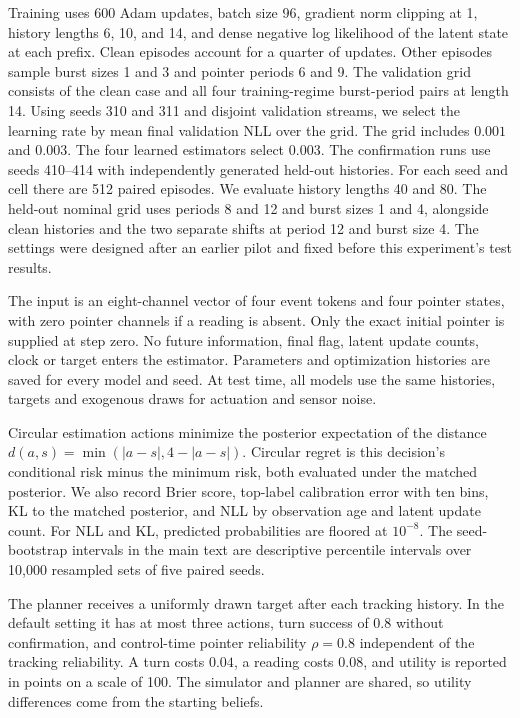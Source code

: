 Training uses 600 Adam updates, batch size 96, gradient norm clipping at 1,
history lengths 6, 10, and 14, and dense negative log likelihood of the
latent state at each prefix. Clean episodes account for a quarter of updates.
Other episodes sample burst sizes 1 and 3 and pointer periods 6 and 9.
The validation grid consists of the clean case and all four training-regime
burst-period pairs at length 14. Using seeds 310 and 311 and disjoint
validation streams, we select the learning rate by mean final validation NLL
over the grid. The grid includes $0.001$ and $0.003$. The four learned estimators
select $0.003$. The confirmation runs use seeds 410--414 with independently
generated held-out histories. For each seed and cell there are 512 paired
episodes. We evaluate history lengths 40 and 80. The held-out nominal grid
uses periods 8 and 12 and burst sizes 1 and 4, alongside clean histories and
the two separate shifts at period 12 and burst size 4. The settings were
designed after an earlier pilot and fixed before this experiment's test results.

The input is an eight-channel vector of four event tokens and four pointer
states, with zero pointer channels if a reading is absent. Only the exact
initial pointer is supplied at step zero. No future information, final flag,
latent update counts, clock or target enters the estimator. Parameters and
optimization histories are saved for every model and seed. At test time,
all models use the same histories, targets and exogenous draws for actuation
and sensor noise.

Circular estimation actions minimize the posterior expectation of the distance
$d(a,s)=\min(|a-s|,4-|a-s|)$. Circular regret is this decision's conditional
risk minus the minimum risk, both evaluated under the matched posterior.
We also record Brier score, top-label calibration error with ten bins, KL to
the matched posterior, and NLL by observation age and latent update count.
For NLL and KL, predicted probabilities are floored at $10^{-8}$.
The seed-bootstrap intervals in the main text are descriptive percentile
intervals over 10,000 resampled sets of five paired seeds.

The planner receives a uniformly drawn target after each tracking history.
In the default setting it has at most three actions, turn success of $0.8$
without confirmation, and control-time pointer reliability $\rho=0.8$
independent of the tracking reliability. A turn costs $0.04$, a reading
costs $0.08$, and utility is reported in points on a scale of 100. The
simulator and planner are shared, so utility differences come from the
starting beliefs.

